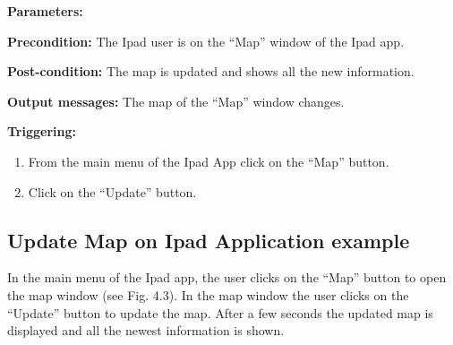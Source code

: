 \begin{description}

\item \textbf{Parameters:} 
\item \textbf{Precondition:} The Ipad user is on the “Map” window of
the Ipad app.
\item \textbf{Post-condition:} The map is updated and shows all the new
information.
\item \textbf{Output messages:} The map of the “Map” window changes.


\item \textbf{Triggering:}
\begin{enumerate}
  \item From the main menu of the Ipad App click on the “Map” button.
  \item Click on the “Update” button.
\end{enumerate}
 

\end{description}

 
\subsection{Update Map on Ipad Application example}
In the main menu of the Ipad app, the user clicks on the “Map” button to open
the map window (see Fig. 4.3). In the map window the user clicks on the “Update”
button to update the map. After a few seconds the updated map is displayed and all the
newest information is shown.
